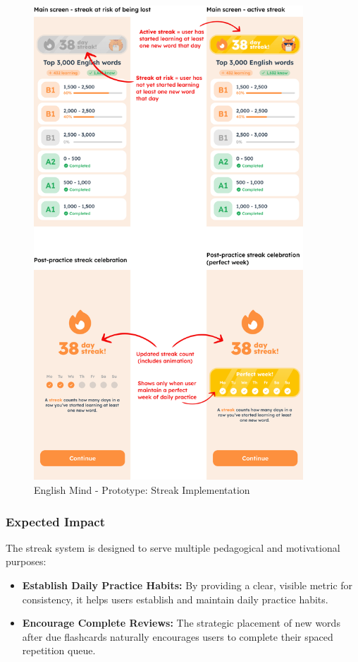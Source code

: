 \begin{figure}[!h]
    \includegraphics[width=0.9\textwidth]{src/figures/em-prototype-streak.png}
    \caption{English Mind - Prototype: Streak Implementation}
    \label{fig:em-prototype-streak}
\end{figure}

\subsubsection{Expected Impact}

The streak system is designed to serve multiple pedagogical and motivational purposes:

\begin{itemize}
    \item \textbf{Establish Daily Practice Habits:} By providing a clear, visible metric for consistency, it helps users establish and maintain daily practice habits.
    
    \item \textbf{Encourage Complete Reviews:} The strategic placement of new words after due flashcards naturally encourages users to complete their spaced repetition queue.
\end{itemize}
